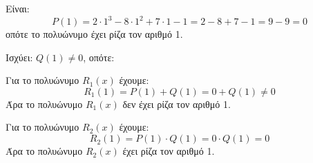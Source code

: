 \begin{alist}
\item Είναι:
\[P(1) = 2\cdot 1^3 - 8\cdot 1^2 + 7\cdot 1 - 1 = 2 - 8 + 7 - 1 = 9 - 9 = 0\]
οπότε το πολυώνυμο έχει ρίζα τον αριθμό 1.
\item Ισχύει: $Q(1) \ne 0$, οπότε:
\begin{rlist}
\item Για το πολυώνυμο $R_1(x)$ έχουμε:
\[R_1(1) = P(1) + Q(1) = 0 + Q(1) \ne 0\]
Άρα το πολυώνυμο $R_1(x)$ δεν έχει ρίζα τον αριθμό 1.
\item Για το πολυώνυμο $R_2(x)$ έχουμε:
\[R_2(1) = P(1)\cdot Q(1) = 0\cdot Q(1) = 0\]
Άρα το πολυώνυμο $R_2(x)$ έχει ρίζα τον αριθμό 1.
\end{rlist}
\end{alist}

